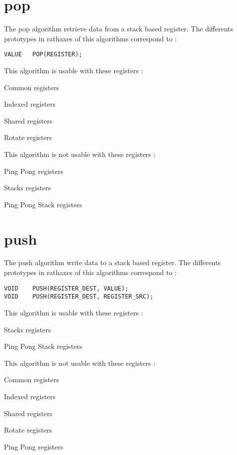 \documentclass[11pt]{report}
\begin{document}
\section{pop}
The pop algorithm retrieve data from a stack based register. The differents 
prototypes in rathaxes of this algorithms correspond to :
\begin{lstlisting}
VALUE	POP(REGISTER);
\end{lstlisting}
This algorithm is usable with these registers : 
\begin{description}
	\item{Common registers}
	\item{Indexed registers}
	\item{Shared registers}
	\item{Rotate registers}
\end{description}
This algorithm is not usable with these registers : 
\begin{description}
	\item{Ping Pong registers}
	\item{Stacks registers}
	\item{Ping Pong Stack registers}
\end{description}

\section{push}
The push algorithm write data to a stack based register. The differents 
prototypes in rathaxes of this algorithms correspond to :
\begin{lstlisting}
VOID	PUSH(REGISTER_DEST, VALUE);
VOID	PUSH(REGISTER_DEST, REGISTER_SRC);
\end{lstlisting}
This algorithm is usable with these registers : 
\begin{description}
	\item{Stacks registers}
	\item{Ping Pong Stack registers}
\end{description}
This algorithm is not usable with these registers : 
\begin{description}
	\item{Common registers}
	\item{Indexed registers}
	\item{Shared registers}
	\item{Rotate registers}
	\item{Ping Pong registers}
\end{description}
\end{document}
